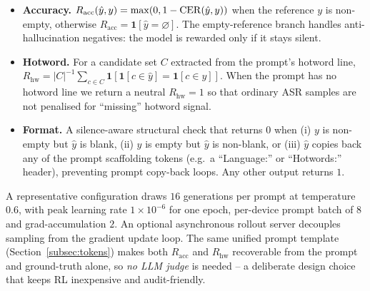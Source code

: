 \begin{itemize}
  \item \textbf{Accuracy.}
        $R_\text{acc}(\hat y, y) = \max(0, 1 - \mathrm{CER}(\hat y, y))$ when
        the reference $y$ is non-empty, otherwise
        $R_\text{acc} = \mathbf{1}[\hat y \!=\! \varnothing]$. The
        empty-reference branch handles anti-hallucination negatives:
        the model is rewarded only if it stays silent.
  \item \textbf{Hotword.}
        For a candidate set $C$ extracted from the prompt's hotword
        line, $R_\text{hw} = |C|^{-1}\sum_{c\in C}
        \mathbf{1}[\mathbf{1}[c\in\hat y]\!=\!\mathbf{1}[c\in y]]$.
        When the prompt has no hotword line we return a neutral
        $R_\text{hw}=1$ so that ordinary ASR samples are not
        penalised for ``missing'' hotword signal.
  \item \textbf{Format.} A silence-aware structural check that
        returns $0$ when (i) $y$ is non-empty but $\hat y$ is blank,
        (ii) $y$ is empty but $\hat y$ is non-blank, or (iii) $\hat y$
        copies back any of the prompt scaffolding tokens (e.g.\ a
        ``Language:'' or ``Hotwords:'' header), preventing prompt
        copy-back loops. Any other output returns $1$.
\end{itemize}

A representative configuration draws $16$ generations per prompt at
temperature $0.6$, with peak learning rate $1\!\times\!10^{-6}$ for
one epoch, per-device prompt batch of $8$ and grad-accumulation $2$.
An optional asynchronous rollout server decouples sampling from the
gradient update loop. The same unified prompt template
(Section~\ref{subsec:tokens}) makes both $R_\text{acc}$ and
$R_\text{hw}$ recoverable from the prompt and ground-truth alone, so
\emph{no LLM judge} is needed -- a deliberate design choice that keeps
RL inexpensive and audit-friendly.
